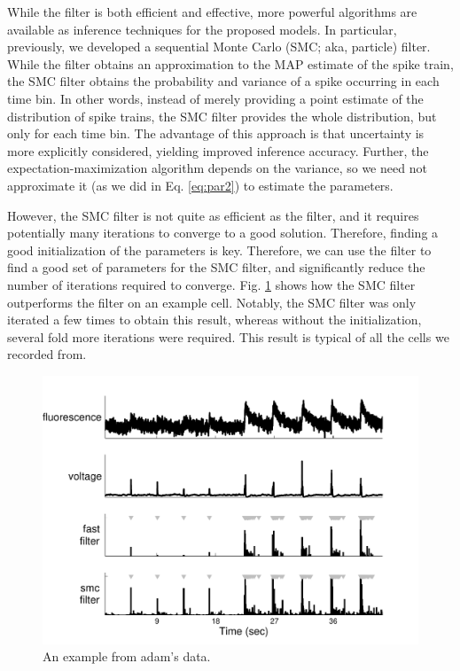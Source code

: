 While the \foopsi filter is both efficient and effective, more powerful algorithms are available as inference techniques for the proposed models.  In particular, previously, we developed a sequential Monte Carlo (SMC; aka, particle) filter.  While the \foopsi filter obtains an approximation to the MAP estimate of the spike train, the SMC filter obtains the probability and variance of a spike occurring in each time bin.  In other words, instead of merely providing a point estimate of the distribution of spike trains, the SMC filter provides the whole distribution, but only for each time bin.  The advantage of this approach is that uncertainty is more explicitly considered, yielding improved inference accuracy.  Further, the expectation-maximization algorithm depends on the variance, so we need not approximate it (as we did in Eq. \eqref{eq:par2}) to estimate the parameters.  

However, the SMC filter is not quite as efficient as the \foopsi filter, and it requires potentially many iterations to converge to a good solution.  Therefore, finding a good initialization of the parameters is key.  Therefore, we can use the \foopsi filter to find a good set of parameters for the SMC filter, and significantly reduce the number of iterations required to converge.  Fig. \ref{fig:smc_init} shows how the SMC filter outperforms the \foopsi filter on an example cell.  Notably, the SMC filter was only iterated a few times to obtain this result, whereas without the \foopsi initialization, several fold more iterations were required.  This result is typical of all the cells we recorded from.

\begin{figure}[h!]
\centering \includegraphics[width=.9\linewidth]{../figs/smc_init}
\caption{An example from adam's data.} \label{fig:smc_init}
\end{figure}